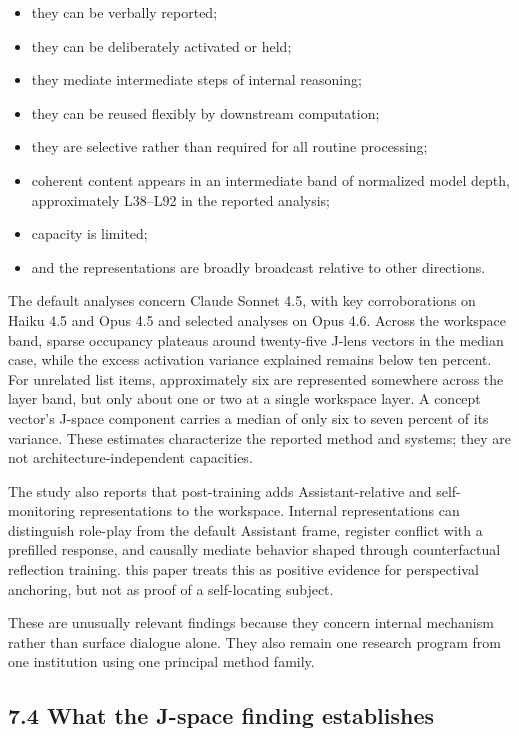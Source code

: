 \documentclass[
  11pt,
]{article}
\providecommand{\tightlist}{%
  \setlength{\itemsep}{0pt}\setlength{\parskip}{0pt}}
\begin{document}
\begin{itemize}
\tightlist
\item
  they can be verbally reported;
\item
  they can be deliberately activated or held;
\item
  they mediate intermediate steps of internal reasoning;
\item
  they can be reused flexibly by downstream computation;
\item
  they are selective rather than required for all routine processing;
\item
  coherent content appears in an intermediate band of normalized model
  depth, approximately L38--L92 in the reported analysis;
\item
  capacity is limited;
\item
  and the representations are broadly broadcast relative to other
  directions.
\end{itemize}

The default analyses concern Claude Sonnet 4.5, with key corroborations
on Haiku 4.5 and Opus 4.5 and selected analyses on Opus 4.6. Across the
workspace band, sparse occupancy plateaus around twenty-five J-lens
vectors in the median case, while the excess activation variance
explained remains below ten percent. For unrelated list items,
approximately six are represented somewhere across the layer band, but
only about one or two at a single workspace layer. A concept vector's
J-space component carries a median of only six to seven percent of its
variance. These estimates characterize the reported method and systems;
they are not architecture-independent capacities.

The study also reports that post-training adds Assistant-relative and
self-monitoring representations to the workspace. Internal
representations can distinguish role-play from the default Assistant
frame, register conflict with a prefilled response, and causally mediate
behavior shaped through counterfactual reflection training. this paper
treats this as positive evidence for perspectival anchoring, but not as
proof of a self-locating subject.

These are unusually relevant findings because they concern internal
mechanism rather than surface dialogue alone. They also remain one
research program from one institution using one principal method family.

\subsection{7.4 What the J-space finding
establishes}\label{what-the-j-space-finding-establishes}
\end{document}
